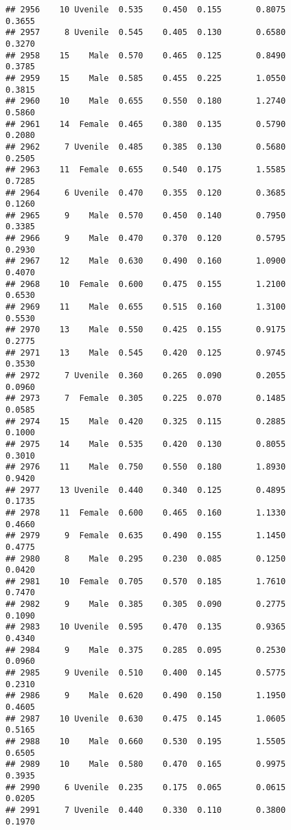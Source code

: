 \documentclass[
]{article}
\begin{document}
\begin{verbatim}
## 2956    10 Uvenile  0.535    0.450  0.155       0.8075         0.3655
## 2957     8 Uvenile  0.545    0.405  0.130       0.6580         0.3270
## 2958    15    Male  0.570    0.465  0.125       0.8490         0.3785
## 2959    15    Male  0.585    0.455  0.225       1.0550         0.3815
## 2960    10    Male  0.655    0.550  0.180       1.2740         0.5860
## 2961    14  Female  0.465    0.380  0.135       0.5790         0.2080
## 2962     7 Uvenile  0.485    0.385  0.130       0.5680         0.2505
## 2963    11  Female  0.655    0.540  0.175       1.5585         0.7285
## 2964     6 Uvenile  0.470    0.355  0.120       0.3685         0.1260
## 2965     9    Male  0.570    0.450  0.140       0.7950         0.3385
## 2966     9    Male  0.470    0.370  0.120       0.5795         0.2930
## 2967    12    Male  0.630    0.490  0.160       1.0900         0.4070
## 2968    10  Female  0.600    0.475  0.155       1.2100         0.6530
## 2969    11    Male  0.655    0.515  0.160       1.3100         0.5530
## 2970    13    Male  0.550    0.425  0.155       0.9175         0.2775
## 2971    13    Male  0.545    0.420  0.125       0.9745         0.3530
## 2972     7 Uvenile  0.360    0.265  0.090       0.2055         0.0960
## 2973     7  Female  0.305    0.225  0.070       0.1485         0.0585
## 2974    15    Male  0.420    0.325  0.115       0.2885         0.1000
## 2975    14    Male  0.535    0.420  0.130       0.8055         0.3010
## 2976    11    Male  0.750    0.550  0.180       1.8930         0.9420
## 2977    13 Uvenile  0.440    0.340  0.125       0.4895         0.1735
## 2978    11  Female  0.600    0.465  0.160       1.1330         0.4660
## 2979     9  Female  0.635    0.490  0.155       1.1450         0.4775
## 2980     8    Male  0.295    0.230  0.085       0.1250         0.0420
## 2981    10  Female  0.705    0.570  0.185       1.7610         0.7470
## 2982     9    Male  0.385    0.305  0.090       0.2775         0.1090
## 2983    10 Uvenile  0.595    0.470  0.135       0.9365         0.4340
## 2984     9    Male  0.375    0.285  0.095       0.2530         0.0960
## 2985     9 Uvenile  0.510    0.400  0.145       0.5775         0.2310
## 2986     9    Male  0.620    0.490  0.150       1.1950         0.4605
## 2987    10 Uvenile  0.630    0.475  0.145       1.0605         0.5165
## 2988    10    Male  0.660    0.530  0.195       1.5505         0.6505
## 2989    10    Male  0.580    0.470  0.165       0.9975         0.3935
## 2990     6 Uvenile  0.235    0.175  0.065       0.0615         0.0205
## 2991     7 Uvenile  0.440    0.330  0.110       0.3800         0.1970

\end{verbatim}
\end{document}
